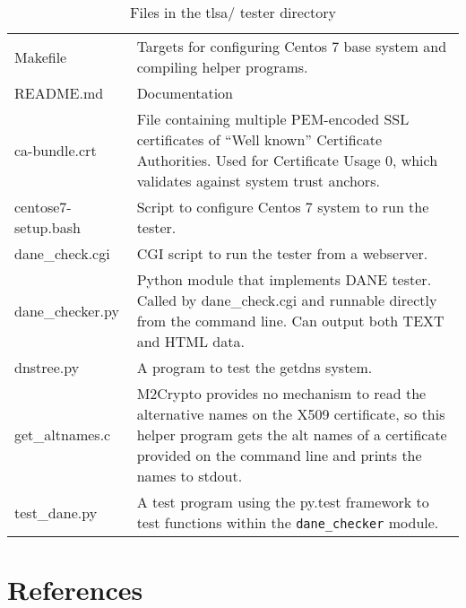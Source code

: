 \documentclass[preprint,5p]{elsarticle}
\begin{document}
\begin{table*}
\begin{tabularx}{\textwidth}{lX}
Makefile & Targets for configuring Centos 7 base system and compiling helper programs. \\
README.md & Documentation \\
ca-bundle.crt & File containing multiple PEM-encoded SSL certificates of ``Well known'' Certificate Authorities. Used for Certificate Usage 0, which validates against system trust anchors. \\
centose7-setup.bash & Script to configure Centos 7 system to run the tester. \\
dane\_check.cgi & CGI script to run the tester from a webserver.\\
dane\_checker.py & Python module that implements DANE tester. Called by dane\_check.cgi and runnable directly from the command line. Can output both TEXT and HTML data.\\
dnstree.py & A program to test the getdns system.\\
get\_altnames.c & M2Crypto provides no mechanism to read the alternative names on the X509 certificate, so this helper program gets the alt names of a certificate provided on the command line and prints the names to stdout.\\
test\_dane.py & A test program using the py.test framework to test functions within the {\tt dane\_checker} module.
\end{tabularx}
\caption{Files in the tlsa/ tester directory}\label{tlsa}
\end{table*}


\section*{References}


\end{document}
